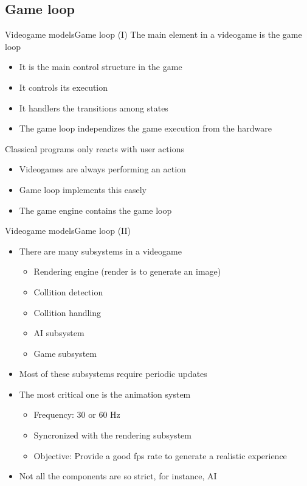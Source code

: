 \documentclass[10pt,compress]{beamer} %
\begin{document}
\subsection{Game loop}
\begin{frame}{Videogame models}{Game loop (I)}
	   	The main element in a videogame is the \alert{game loop}
		\begin{itemize}
			\item It is the main control structure in the game
			\item It controls its execution
			\item It handlers the transitions among states
			\item The game loop independizes the game execution from the hardware
		\end{itemize}
		Classical programs only reacts with user actions
		\begin{itemize}
			\item Videogames are always performing an action
			\item Game loop implements this easely
			\item The game engine contains the game loop
		\end{itemize}
\end{frame}

\begin{frame}{Videogame models}{Game loop (II)}
		\begin{itemize}
		   	\item There are many subsystems in a videogame
			\begin{itemize}
				\item Rendering engine (render is to generate an image)
				\item Collition detection
				\item Collition handling
				\item AI subsystem
				\item Game subsystem
			\end{itemize}
			\item Most of these subsystems require periodic updates
			\item The most critical one is the animation system
			\begin{itemize}
				\item Frequency: 30 or 60 Hz
				\item Syncronized with the rendering subsystem
				\item Objective: Provide a good fps rate to generate a realistic experience
			\end{itemize}
			\item Not all the components are so strict, for instance, AI
		\end{itemize}
\end{frame}
\end{document}
